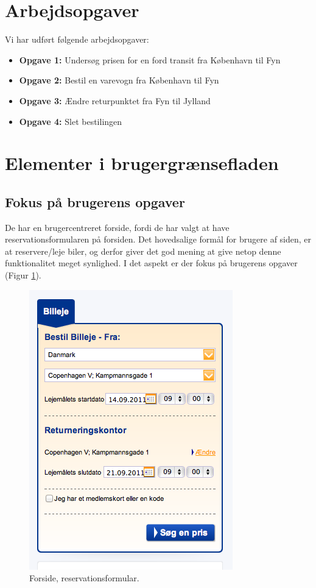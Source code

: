 \documentclass[a4paper]{article}
\title{}
\author{Claus Skou Nielsen, Michael Budde, Kasper Passov, Niels Ørbæk
Christensen}
\begin{document}
\section{Arbejdsopgaver}
Vi har udført følgende arbejdsopgaver:
\begin{itemize}
\item{\textbf{Opgave 1:}}
    Undersøg prisen for en ford transit fra København til Fyn
\item{\textbf{Opgave 2:}}
    Bestil en varevogn fra København til Fyn
\item{\textbf{Opgave 3:}}
    Ændre returpunktet fra Fyn til Jylland
\item{\textbf{Opgave 4:}}
    Slet bestilingen
\end{itemize}

\section{Elementer i brugergrænsefladen}
\subsection{Fokus på brugerens opgaver}
De har en brugercentreret forside, fordi de har valgt at have
reservationsformularen på forsiden. Det hovedsalige formål for brugere af siden,
er at reservere/leje biler, og derfor giver det god mening at give netop denne
funktionalitet meget synlighed. I det aspekt er der fokus på brugerens opgaver
(Figur \ref{forside}).

\begin{figure}[]
  \begin{center}
    \includegraphics{1.png}
  \end{center}
  \caption{Forside, reservationsformular.}
  \label{forside}
\end{figure}
\end{document}
